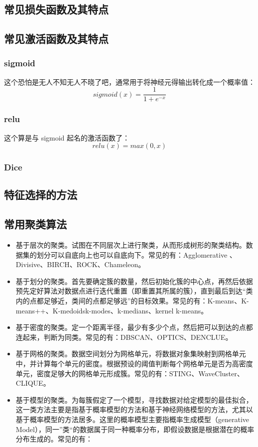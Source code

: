 \subsection{常见损失函数及其特点}


\subsection{常见激活函数及其特点}
\subsubsection{sigmoid}
这个恐怕是无人不知无人不晓了吧，通常用于将神经元得输出转化成一个概率值：
$$
sigmoid(x) = \frac{1}{1 + e^{-x}}
$$

\subsubsection{relu}
这个算是与 sigmoid 起名的激活函数了：
$$
relu(x) = max(0, x)
$$

\subsubsection{Dice}




\subsection{特征选择的方法}

\subsection{常用聚类算法}

\begin{itemize}
	\item 基于层次的聚类。试图在不同层次上进行聚类，从而形成树形的聚类结构。数据集的划分可以自底向上也可以自底向下。常见的有：Agglomerative 、Divisive、BIRCH、ROCK、Chameleon。

	\item 基于划分的聚类。首先要确定簇的数量，然后初始化簇的中心点，再然后依据预先定好算法对数据点进行迭代重置（即重置其所属的簇），直到最后到达“类内的点都足够近，类间的点都足够远”的目标效果。常见的有：K-means、K-means++、K-medoidsk-modes、k-medians、kernel k-means。
	
	\item 基于密度的聚类。定一个距离半径，最少有多少个点，然后把可以到达的点都连起来，判断为同类。常见的有：DBSCAN、OPTICS、DENCLUE。
	
	\item 基于网格的聚类。数据空间划分为网格单元，将数据对象集映射到网格单元中，并计算每个单元的密度。根据预设的阈值判断每个网格单元是否为高密度单元，密度足够大的网格单元形成簇。常见的有：STING、WaveCluster、CLIQUE。
	
	\item 基于模型的聚类。为每簇假定了一个模型，寻找数据对给定模型的最佳拟合，这一类方法主要是指基于概率模型的方法和基于神经网络模型的方法，尤其以基于概率模型的方法居多。这里的概率模型主要指概率生成模型（generative Model），同一”类“的数据属于同一种概率分布，即假设数据是根据潜在的概率分布生成的。常见的有：
\end{itemize}
